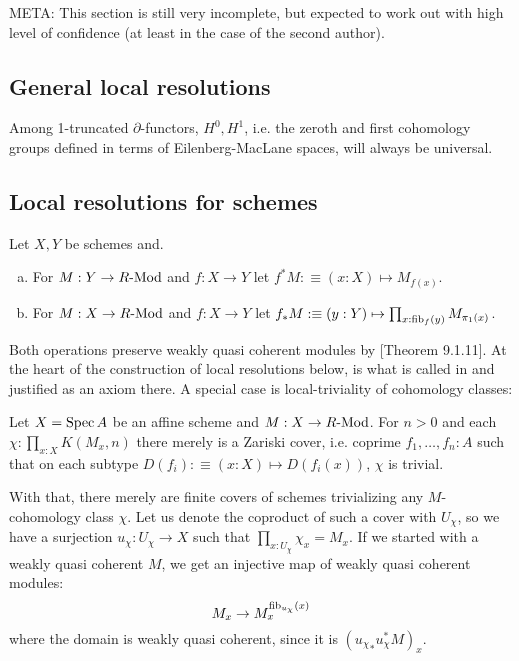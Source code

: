 
META: This section is still very incomplete, but expected to work out with high level of confidence
(at least in the case of the second author).

\subsection{General local resolutions}

Among 1-truncated $\partial$-functors, $H^0, H^1$, i.e. the zeroth and first cohomology groups defined in terms of Eilenberg-MacLane spaces, will always be universal.

\subsection{Local resolutions for schemes}

\begin{definition}
  Let $X,Y$ be schemes and.
  \begin{enumerate}[(a)]
  \item For $M:Y\to R\text{-}\mathrm{Mod}$ and $f:X\to Y$ let $f^*M:\equiv (x:X)\mapsto M_{f(x)}$.
  \item For $M:X\to R\text{-}\mathrm{Mod}$ and $f:X\to Y$ let $f_*M:\equiv (y:Y)\mapsto \prod_{x:\mathrm{fib}_f(y)}M_{\pi_1(x)}$.
  \end{enumerate}
\end{definition}

Both operations preserve weakly quasi coherent modules by \cite{draft}[Theorem 9.1.11].
At the heart of the construction of local resolutions below,
is what is called  in \cite{draft} and justified as an axiom there.
A special case is local-triviality of cohomology classes:

\begin{axiom}
  Let $X=\operatorname{Spec} A$ be an affine scheme and $M:X\to R\text{-}\mathrm{Mod}$.
  For $n>0$ and each $\chi:\prod_{x:X}K(M_x,n)$ there merely is a Zariski cover,
  i.e. coprime
  $f_1,\dots,f_n:A$ such that on each subtype $D(f_i):\equiv (x:X)\mapsto D(f_i(x))$,
  $\chi$ is trivial.
\end{axiom}

With that, there merely are finite covers of schemes trivializing any $M$-cohomology class $\chi$.
Let us denote the coproduct of such a cover with $U_\chi$,
so we have a surjection $u_\chi:U_\chi\to X$ such that $\prod_{x:U_\chi}\chi_x=M_x$.
If we started with a weakly quasi coherent $M$,
we get an injective map of weakly quasi coherent modules:
\[
  M_x \to M_x^{\mathrm{fib}_{u_\chi}(x)}
\]
where the domain is weakly quasi coherent, since it is $({u_\chi}_*u_\chi^*M)_x$.

